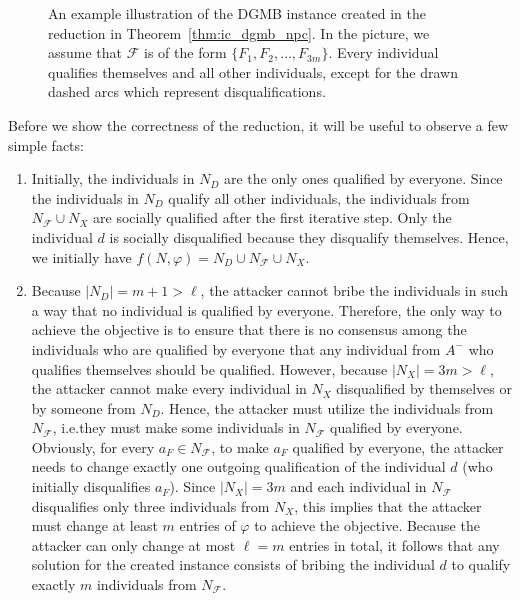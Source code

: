 \documentclass[
    12pt,               %
    a4paper,            %
    bibtotoc,           %
    pointlessnumbers,   %
    ngerman,            %
    titlepage,          %
    leqno,              %
    ]{scrarticle}       %
\newcommand\thmref{Theorem~\ref}
\begin{document}
\begin{Proof}
\begin{figure}[!tbh]
{
}
\caption{An example illustration of the DGMB instance created in the reduction in \thmref{thm:ic_dgmb_npc}. In the picture, we assume that $\mathcal{F}$ is of the form $\{ F_1, F_2, \ldots, F_{3m} \}$. Every individual qualifies themselves and all other individuals, except for the drawn dashed arcs which represent disqualifications.}
\label{fig:ic_dgmb_npc}
\end{figure}



Before we show the correctness of the reduction, it will be useful to observe a few simple facts:

\begin{enumerate}[
    topsep=-4pt,
    leftmargin=*,
    itemindent=4.96em,
    label={\textit{Fact \ref*{thm:ic_dgmb_npc}.\arabic*}:},
    ref={\ref*{thm:ic_dgmb_npc}.\arabic*}
]
\item \label{fact:ic_dgmb_initial_situation}
Initially, the individuals in $N_D$ are the only ones qualified by everyone. Since the individuals in $N_D$ qualify all other individuals, the individuals from $N_\mathcal{F} \cup N_X$ are socially qualified after the first iterative step. Only the individual $d$ is socially disqualified because they disqualify themselves. Hence, we initially have $f(N, \varphi) = N_D \cup N_\mathcal{F} \cup N_X$.

\item \label{fact:ic_dgmb_only_bribe_d}
Because $|N_D| = m+1 > \ell$, the attacker cannot bribe the individuals in such a way that no individual is qualified by everyone. Therefore, the only way to achieve the objective is to ensure that there is no consensus among the individuals who are qualified by everyone that any individual from $A^-$ who qualifies themselves should be qualified. However, because $|N_X| = 3m > \ell$, the attacker cannot make every individual in $N_X$ disqualified by themselves or by someone from $N_D$. Hence, the attacker must utilize the individuals from $N_\mathcal{F}$, i.e.\@ they must make some individuals in $N_\mathcal{F}$ qualified by everyone. Obviously, for every $a_F \in N_\mathcal{F}$, to make $a_F$ qualified by everyone, the attacker needs to change exactly one outgoing qualification of the individual $d$ (who initially disqualifies $a_F$). Since $|N_X| = 3m$ and each individual in $N_\mathcal{F}$ disqualifies only three individuals from $N_X$, this implies that the attacker must change at least $m$ entries of $\varphi$ to achieve the objective. Because the attacker can only change at most $\ell = m$ entries in total, it follows that any solution for the created instance consists of bribing the individual $d$ to qualify exactly $m$ individuals from $N_\mathcal{F}$.


\end{enumerate}
\end{Proof}
\end{document}
